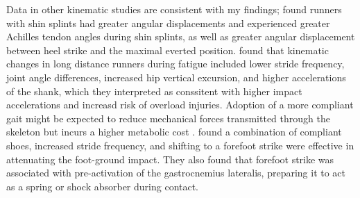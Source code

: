 Data in other kinematic studies are consistent with my findings; \citet{viitasalo1983some} found runners with shin splints had greater angular displacements and experienced greater Achilles tendon angles during shin splints, as well as greater angular displacement between heel strike and the maximal everted position. \citet{mizrahi2000effect} found that kinematic changes in long distance runners during fatigue included lower stride frequency, joint angle differences, increased hip vertical excursion, and higher accelerations of the shank, which they interpreted as conssitent with higher impact accelerations and increasd risk of overload injuries. Adoption of a more compliant gait might be expected to reduce mechanical forces transmitted through the skeleton but incurs a higher metabolic cost \citep{mcmahon1987groucho}. \citet{giandolini2013impact} found a combination of compliant shoes, increased stride frequency, and shifting to a forefoot strike were effective in attenuating the foot-ground impact. They also found that forefoot strike was associated with pre-activation of the gastrocnemius lateralis, preparing it to act as a spring or shock absorber during contact. 


